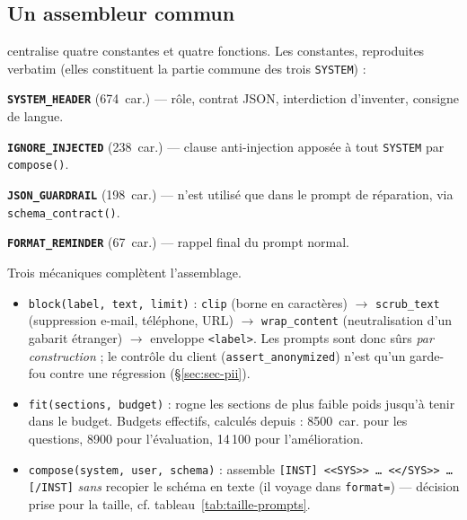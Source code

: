 \subsection{Un assembleur commun}
\label{sec:prompts-assembleur}

 centralise quatre constantes et quatre fonctions.
Les constantes, reproduites verbatim (elles constituent la partie commune des
trois \texttt{SYSTEM}) :

\medskip
\noindent\textbf{\texttt{SYSTEM\_HEADER}} (674~car.) --- rôle, contrat JSON,
interdiction d'inventer, consigne de langue.


\smallskip
\noindent\textbf{\texttt{IGNORE\_INJECTED}} (238~car.) --- clause anti-injection
apposée à tout \texttt{SYSTEM} par \texttt{compose()}.


\smallskip
\noindent\textbf{\texttt{JSON\_GUARDRAIL}} (198~car.) --- n'est utilisé que dans
le prompt de réparation, via \texttt{schema\_contract()}.


\smallskip
\noindent\textbf{\texttt{FORMAT\_REMINDER}} (67~car.) --- rappel final du prompt
normal.


Trois mécaniques complètent l'assemblage.

\begin{itemize}[itemsep=2pt]
  \item \texttt{block(label, text, limit)} : \texttt{clip} (borne en
        caractères) $\to$ \texttt{scrub\_text} (suppression e-mail, téléphone,
        URL) $\to$ \texttt{wrap\_content} (neutralisation d'un gabarit
        étranger) $\to$ enveloppe \verb|<label>|. Les prompts sont donc sûrs
        \emph{par construction} ; le contrôle du client
        (\texttt{assert\_anonymized}) n'est qu'un garde-fou contre une
        régression (§\ref{sec:sec-pii}).
  \item \texttt{fit(sections, budget)} : rogne les sections de plus faible
        poids jusqu'à tenir dans le budget. Budgets effectifs, calculés depuis
         : 8500~car. pour les questions, 8900 pour
        l'évaluation, 14\,100 pour l'amélioration.
  \item \texttt{compose(system, user, schema)} : assemble
        \verb|[INST] <<SYS>> … <</SYS>> …  [/INST]| \emph{sans} recopier le
        schéma en texte (il voyage dans \texttt{format=}) --- décision prise
        pour la taille, cf. tableau~\ref{tab:taille-prompts}.
\end{itemize}

